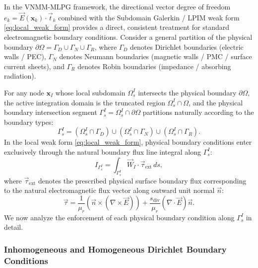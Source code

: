 \documentclass[VANCOUVER,Times1COL]{WileyNJD-v5}
\begin{document}
In the VNMM-MLPG framework, the directional vector degree of freedom $e_k = \vec{E}(\mathbf{x}_k) \cdot \vec{t}_k$ combined with the Subdomain Galerkin / LPIM weak form \eqref{eq:local_weak_form} provides a direct, consistent treatment for standard electromagnetic boundary conditions. Consider a general partition of the physical boundary $\partial\Omega = \Gamma_D \cup \Gamma_N \cup \Gamma_R$, where $\Gamma_D$ denotes Dirichlet boundaries (electric walls / PEC), $\Gamma_N$ denotes Neumann boundaries (magnetic walls / PMC / surface current sheets), and $\Gamma_R$ denotes Robin boundaries (impedance / absorbing radiation).

For any node $\mathbf{x}_I$ whose local subdomain $\Omega_s^I$ intersects the physical boundary $\partial\Omega$, the active integration domain is the truncated region $\Omega_s^I \cap \Omega$, and the physical boundary intersection segment $\Gamma_s^I = \Omega_s^I \cap \partial\Omega$ partitions naturally according to the boundary types:
\begin{equation}
    \Gamma_s^I = (\Omega_s^I \cap \Gamma_D) \cup (\Omega_s^I \cap \Gamma_N) \cup (\Omega_s^I \cap \Gamma_R).
\end{equation}
In the local weak form \eqref{eq:local_weak_form}, physical boundary conditions enter exclusively through the natural boundary flux line integral along $\Gamma_s^I$:
\begin{equation}
    I_{\Gamma_s^I} = \int_{\Gamma_s^I} \vec{W}_I \cdot \vec{\tau}_{\mathrm{ext}} \, ds,
    \label{eq:boundary_flux_partition}
\end{equation}
where $\vec{\tau}_{\mathrm{ext}}$ denotes the prescribed physical surface boundary flux corresponding to the natural electromagnetic flux vector along outward unit normal $\vec{n}$:
\begin{equation}
    \vec{\tau} = \frac{1}{\mu_r} \left( \vec{n} \times (\nabla \times \vec{E}) \right) + \frac{s_{\mathrm{div}}}{\mu_r} (\nabla \cdot \vec{E}) \vec{n}.
    \label{eq:traction_vector}
\end{equation}
We now analyze the enforcement of each physical boundary condition along $\Gamma_s^I$ in detail.

\subsubsection{Inhomogeneous and Homogeneous Dirichlet Boundary Conditions}
\label{subsubsec:dirichlet_bc}
\end{document}

